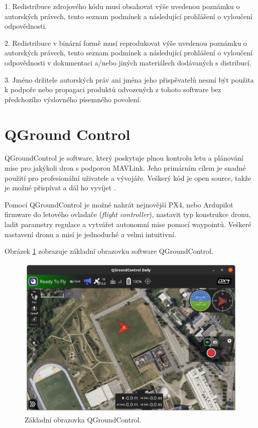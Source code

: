 1. Redistribuce zdrojového kódu musí obsahovat výše uvedenou poznámku o autorských právech, tento seznam podmínek a následující prohlášení o vyloučení odpovědnosti.

2. Redistribuce v binární formě musí reprodukovat výše uvedenou poznámku o autorských právech, tento seznam podmínek a následující prohlášení o vyloučení odpovědnosti v dokumentaci a/nebo jiných materiálech dodávaných s distribucí.

3. Jméno držitele autorských práv ani jména jeho přispěvatelů nesmí být použita k podpoře nebo propagaci produktů odvozených z tohoto software bez předchozího výslovného písemného povolení.

\section{QGround Control}

QGroundControl je software, který poskytuje plnou kontrolu letu a plánování mise pro jakýkoli dron s podporou MAVLink. Jeho primárním cílem je snadné použití pro profesionální uživatele a vývojáře. Veškerý kód je open source, takže je možné přispívat a dál ho vyvíjet \cite{QGround}.

Pomocí QGroundControl je možné nahrát nejnovější PX4, nebo Ardupilot firmware do letového ovladače (\textit{flight controller}), nastavit typ konstrukce dronu, ladit parametry regulace a vytvářet autonomní mise pomocí waypointů. Veškeré nastavení dronu a misí je jednoduché a velmi intuitivní.

Obrázek \ref{fig:QGC} zobrazuje základní obrazovku software QGroundControl.

\begin{figure}[!ht]
    \begin{center}
        \includegraphics[scale=0.47]{obrazky/QG1}
    \end{center}
    \caption[Základní obrazovka QGroundControl]{Základní obrazovka QGroundControl.}
    \label{fig:QGC}
\end{figure}

